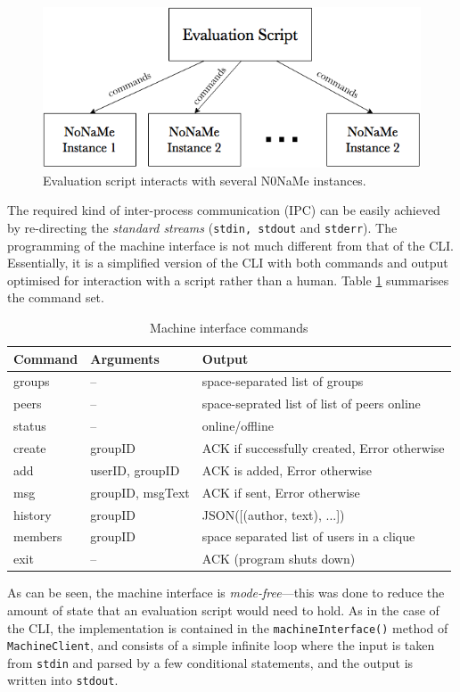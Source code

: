 \documentclass[a4paper, twoside, 12pt]{report}
\newcommand{\funkytt}{\fontfamily{AnonymousPro}\selectfont}
\begin{document}
\begin{figure}[H]
    \captionsetup{width=0.84\textwidth}
    \centering
    \includegraphics[width=0.76\linewidth]{pics/eval_script.png}
    \caption{\label{fig:eval_script} Evaluation script interacts with several {\funkytt N0NaMe} instances.}
\end{figure}

The required kind of inter-process communication (IPC) can be easily achieved by re-directing the \emph{standard streams} (\texttt{stdin, stdout} and \texttt{stderr}). The programming of the machine interface is not much different from that of the CLI. Essentially, it is a simplified version of the CLI with both commands and output optimised for interaction with a script rather than a human. Table \ref{tab:MachineInterface} summarises the command set.

\begin{table}[H]
\centering
\begin{tabular*}{0.95\textwidth}{l | l | l}
    Command & Arguments & Output \\
    \hline
    groups & -- & space-separated list of groups \\
    peers & -- & space-seprated list of list of peers online \\
    status & -- & online/offline \\
    create & groupID & ACK if successfully created, Error otherwise \\
    add & userID, groupID & ACK is added, Error otherwise \\
    msg & groupID, msgText & ACK if sent, Error otherwise \\
    history & groupID & JSON([(author, text), ...]) \\
    members & groupID & space separated list of users in a clique \\
    exit & -- & ACK (program shuts down)
\end{tabular*}
\caption{\label{tab:MachineInterface} Machine interface commands}
\end{table}
As can be seen, the machine interface is \emph{mode-free}---this was done to reduce the amount of state that an evaluation script would need to hold. As in the case of the CLI, the implementation is contained in the \texttt{machineInterface()} method of \texttt{MachineClient}, and consists of a simple infinite loop where the input is taken from \texttt{stdin} and parsed by a few conditional statements, and the output is written into \texttt{stdout}.
\end{document}
